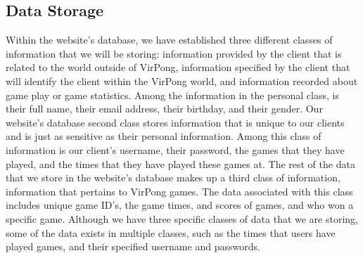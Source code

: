 %

	\subsection{Data Storage}
		Within the website's database, we have established three different classes of information that we will be storing: information provided by the client that is related to the world outside of VirPong, information specified by the client that will identify the client within the VirPong world, and information recorded about game play or game statistics. Among the information in the personal class, is their full name, their email address, their birthday, and their gender. Our website's database second class stores information that is unique to our clients and is just as sensitive as their personal information. Among this class of information is our client's username, their password, the games that they have played, and the times that they have played these games at. The rest of the data that we store in the website's database makes up a third class of information, information that pertains to VirPong games. The data associated with this class includes unique game ID's, the game times, and scores of games, and who won a specific game. Although we have three specific classes of data that we are storing, some of the data exists in multiple classes, such as the times that users have played games, and their specified username and passwords.


